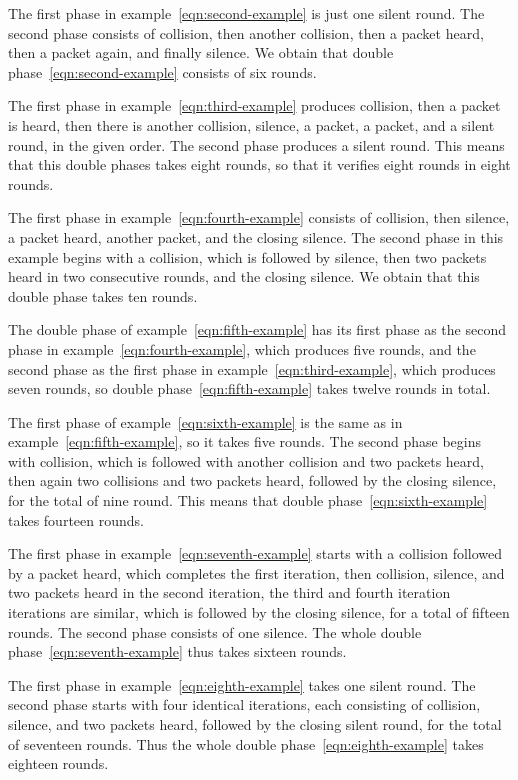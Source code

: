 \documentclass[11pt]{article}
\begin{document}
The first phase in example~\eqref{eqn:second-example}  is just one silent round.
The second phase consists of collision, then another collision, then a packet heard, then a packet again, and finally silence.
We obtain that double phase~\eqref{eqn:second-example} consists of six rounds.

The first phase in example~\eqref{eqn:third-example} produces collision, then a packet is heard, then there is another collision, silence, a packet, a packet, and a silent round, in the  given order.
The second phase produces a silent round.
This means that this double phases takes eight rounds, so that it verifies eight rounds in eight rounds.


The first phase in example~\eqref{eqn:fourth-example} consists of  collision, then silence, a packet heard, another packet, and the closing silence.
The second phase in this example begins with a collision, which is followed by silence, then two packets heard in two consecutive rounds, and the closing silence.
We obtain that this double phase  takes ten rounds.

The double phase of example~\eqref{eqn:fifth-example} has its first phase as the second phase in example~\eqref{eqn:fourth-example}, which produces five rounds, and the second phase as the first phase in example~\eqref{eqn:third-example}, which produces seven rounds, so double phase~\eqref{eqn:fifth-example} takes twelve rounds in total. 

The first phase of example~\eqref{eqn:sixth-example} is the same as in example~\eqref{eqn:fifth-example}, so it takes five rounds.
The second phase begins with collision, which is followed with another collision and two packets heard, then again two collisions and two packets heard, followed by the closing silence, for the total of nine round.
This means that  double phase~\eqref{eqn:sixth-example} takes fourteen rounds.

The first  phase in example~\eqref{eqn:seventh-example} starts with a collision followed by a packet heard, which completes the first iteration,  then collision, silence, and two packets heard in the second iteration, the third and fourth iteration iterations are similar, which is followed by the closing silence, for a total of fifteen rounds.
The second phase consists of one silence.
The whole double phase~\eqref{eqn:seventh-example} thus takes sixteen  rounds.

The first phase in example~\eqref{eqn:eighth-example} takes one silent round.
The second phase starts with four identical iterations, each consisting of collision,  silence, and two packets heard, followed by the closing silent round, for the total of seventeen rounds.
Thus the whole double phase~\eqref{eqn:eighth-example} takes eighteen rounds.
\end{document}
